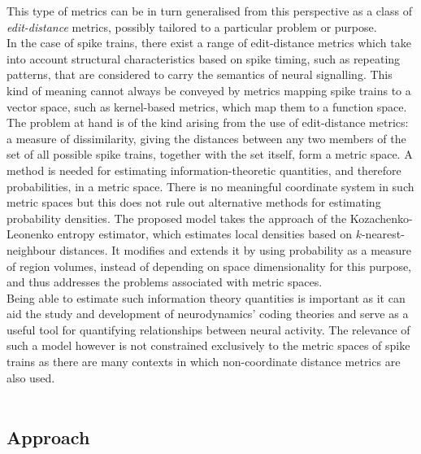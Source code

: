 \documentclass[12pt]{extarticle}
\begin{document}
\noindent This type of metrics can be in turn generalised from this perspective as a class of  \textit{edit-distance} metrics, possibly tailored to a particular problem or purpose.\\

\noindent In the case of spike trains, there exist a range of edit-distance metrics which take into account structural characteristics based on spike timing, such as repeating patterns, that are considered to carry the semantics of neural signalling. This kind of meaning cannot always be conveyed by metrics mapping spike trains to a vector space, such as kernel-based metrics, which map them to a function space.\\

\noindent The problem at hand is of the kind arising from the use of edit-distance metrics: a measure of dissimilarity, giving the distances between any two members of the set of all possible spike trains, together with the set itself, form a metric space. A method is needed for estimating information-theoretic quantities, and therefore probabilities, in a metric space. There is no meaningful coordinate system in such metric spaces but this does not rule out alternative methods for estimating probability densities. The proposed model \cite{HC14} takes the approach of the Kozachenko-Leonenko \cite{KL} entropy estimator, which estimates local densities based on $k$-nearest-neighbour distances. It modifies and extends it by using probability as a measure of region volumes, instead of depending on space dimensionality for this purpose, and thus addresses the problems associated with metric spaces.\\

\noindent Being able to estimate such information theory quantities is important as it can aid the study and development of neurodynamics' coding theories and serve as a useful tool for quantifying relationships between neural activity. The relevance of such a model however is not constrained exclusively to the metric spaces of spike trains as there are many contexts in which non-coordinate distance metrics are also used.\\ \\

\newpage
{}
\subsection*{Approach}
\end{document}
